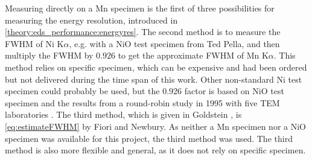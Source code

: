 Measuring directly on a Mn specimen is the first of three possibilities for measuring the energy resolution, introduced in \cref{theory:eds_performance:energyres}.
The second method is to measure the FWHM of Ni K$\alpha$, e.g. with a NiO test specimen from Ted Pella, and then multiply the FWHM by $0.926$ to get the approximate FWHM of Mn K$\alpha$.
This method relies on specific specimen, which can be expensive and had been ordered but not delivered during the time span of this work.
Other non-standard Ni test specimen could probably be used, but the 0.926 factor is based on NiO test specimen and the results from a round-robin study in 1995 with five TEM laboratories \cite{bennett_egerton_1995}.
The third method, which is given in Goldstein \cite{goldstein_scanning_2018}, is \cref{eq:estimateFWHM} by Fiori and Newbury.
As neither a Mn specimen nor a NiO specimen was available for this project, the third method was used.
The third method is also more flexible and general, as it does not rely on specific specimen.





